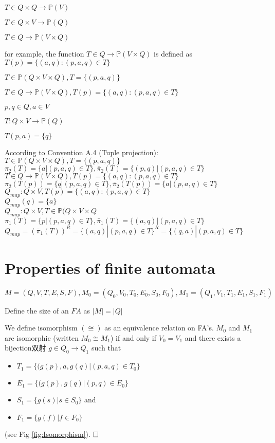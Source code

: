 $T \in Q\times Q \to \mathbb{P}(V)$

$T \in Q \times V \to \mathbb{P}(Q)$

$T \in Q \to \mathbb{P}(V \times Q)$

for example, the function $T \in Q \to \mathbb{P}(V \times Q)$ is defined as $T(p) = \{(a,q):(p,a,q) \in T\}$


\hfill

$T \in \mathbb{P}(Q \times V \times Q), T = \{(p,a,q) \}$

$T\in Q \to \mathbb{P}(V\times Q), T(p) = \{(a,q):(p,a,q) \in T\}$

\hfill

$p,q\in Q, a\in V$

$T:Q\times V\to \mathbb{P}(Q)$

$T(p,a)=\{q\}$


\hfill

According to Convention A.4 (Tuple projection):\\
$T \in \mathbb{P}(Q \times V \times Q), T = \{(p,a,q) \}$\\
$\pi_2(T)=\{a|(p,a,q)\in T\}, \bar{\pi}_2(T)=\{(p,q)|(p,a,q)\in T\}$\\
$T\in Q \to \mathbb{P}(V\times Q), T(p) = \{(a,q):(p,a,q) \in T\}$\\
$\pi_2(T(p))=\{q|(p,a,q)\in T\}, \bar{\pi}_2(T(p))=\{a|(p,a,q)\in T\}$\\
$Q_{map}:Q\times V,T(p) = \{(a,q):(p,a,q) \in T\}$\\
$Q_{map}(q)=\{a\}$\\
$Q_{map}:Q\times V,T \in \mathbb{P}(Q \times V \times Q$\\
$\pi_1(T)=\{p|(p,a,q)\in T\}, \bar{\pi}_1(T)=\{(a,q)|(p,a,q)\in T\}$\\
$Q_{map}=(\bar{\pi}_1(T))^R=\{(a,q)|(p,a,q)\in T\}^R=\{(q,a)|(p,a,q)\in T\}$


\section{Properties of finite automata}

$M=(Q,V,T,E,S,F),M_0=(Q_0,V_0,T_0,E_0,S_0,F_0),M_1=(Q_1,V_1,T_1,E_1,S_1,F_1)$

\begin{definition}[Size of an $FA$]
	Define the size of an $FA$ as $|M|=|Q|$
\end{definition}

\begin{definition}
	We define isomorphism $(\cong)$ as an equivalence relation on FA's. $M_0$ and $M_1$ are isomorphic (written $M_0\cong M_1$) if and only if $V_0=V_1$ and there exists a bijection双射 $g\in Q_0\to Q_1$ such that
	\begin{itemize}
		\item $T_1=\{(g(p),a,g(q)|(p,a,q)\in T_0\}$
		\item $E_1=\{(g(p),g(q)|(p,q)\in E_0\}$
		\item $S_1=\{g(s)|s\in S_0\}$ and
		\item $F_1=\{g(f)|f\in F_0\}$
	\end{itemize} (see Fig \ref{fig:Isomorphism}). $\hfill\square$
\end{definition}

